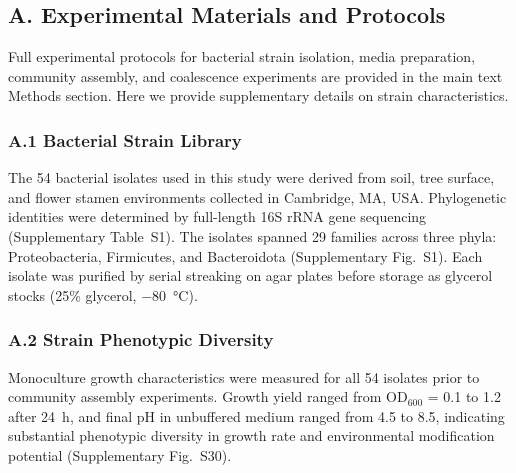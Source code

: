 \subsection*{A. Experimental Materials and Protocols}
\label{sec:suppl:materials}

Full experimental protocols for bacterial strain isolation, media preparation, community assembly, and coalescence experiments are provided in the main text Methods section. Here we provide supplementary details on strain characteristics.

\subsubsection*{A.1 Bacterial Strain Library}

The 54 bacterial isolates used in this study were derived from soil, tree surface, and flower stamen environments collected in Cambridge, MA, USA. Phylogenetic identities were determined by full-length 16S rRNA gene sequencing (Supplementary Table~S1). The isolates spanned 29 families across three phyla: Proteobacteria, Firmicutes, and Bacteroidota (Supplementary Fig.~S1). Each isolate was purified by serial streaking on agar plates before storage as glycerol stocks (25\% glycerol, $-80$~°C).

\subsubsection*{A.2 Strain Phenotypic Diversity}

Monoculture growth characteristics were measured for all 54 isolates prior to community assembly experiments. Growth yield ranged from OD$_{600}$ = 0.1 to 1.2 after 24~h, and final pH in unbuffered medium ranged from 4.5 to 8.5, indicating substantial phenotypic diversity in growth rate and environmental modification potential (Supplementary Fig.~S30).

